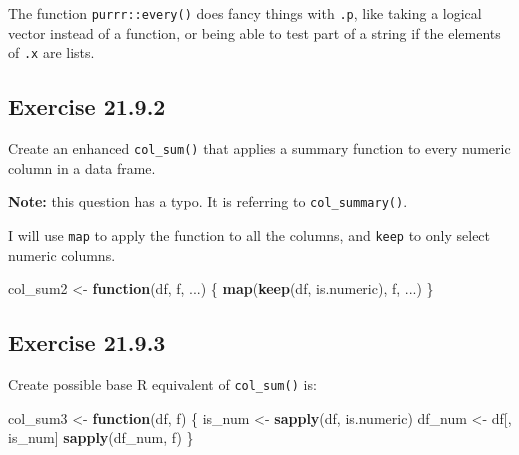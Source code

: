 \documentclass[]{book}
\newenvironment{Shaded}{\begin{snugshade}}{\end{snugshade}}
\newcommand{\CommentTok}[1]{\textcolor[rgb]{0.56,0.35,0.01}{\textit{#1}}}
\newcommand{\ControlFlowTok}[1]{\textcolor[rgb]{0.13,0.29,0.53}{\textbf{#1}}}
\newcommand{\KeywordTok}[1]{\textcolor[rgb]{0.13,0.29,0.53}{\textbf{#1}}}
\newcommand{\NormalTok}[1]{#1}
\newcommand{\StringTok}[1]{\textcolor[rgb]{0.31,0.60,0.02}{#1}}
\theoremstyle{plain}
\theoremstyle{remark}
\theoremstyle{definition}
\theoremstyle{definition}
\theoremstyle{definition}
\theoremstyle{remark}
\begin{document}
The function \texttt{purrr::every()} does fancy things with \texttt{.p},
like taking a logical vector instead of a function, or being able to
test part of a string if the elements of \texttt{.x} are lists.

\hypertarget{exercise-21.9.2}{%
\subsection*{\texorpdfstring{Exercise
{21.9.2}}{Exercise 21.9.2}}\label{exercise-21.9.2}}

Create an enhanced \texttt{col\_sum()} that applies a summary function
to every numeric column in a data frame.

\textbf{Note:} this question has a typo. It is referring to
\texttt{col\_summary()}.

I will use \texttt{map} to apply the function to all the columns, and
\texttt{keep} to only select numeric columns.

\begin{Shaded}
\begin{Highlighting}[]
\NormalTok{col_sum2 <-}\StringTok{ }\ControlFlowTok{function}\NormalTok{(df, f, ...) \{}
  \KeywordTok{map}\NormalTok{(}\KeywordTok{keep}\NormalTok{(df, is.numeric), f, ...)}
\NormalTok{\}}
\end{Highlighting}
\end{Shaded}

\begin{Shaded}
\end{Shaded}

\hypertarget{exercise-21.9.3}{%
\subsection*{\texorpdfstring{Exercise
{21.9.3}}{Exercise 21.9.3}}\label{exercise-21.9.3}}

Create possible base R equivalent of \texttt{col\_sum()} is:

\begin{Shaded}
\begin{Highlighting}[]
\NormalTok{col_sum3 <-}\StringTok{ }\ControlFlowTok{function}\NormalTok{(df, f) \{}
\NormalTok{  is_num <-}\StringTok{ }\KeywordTok{sapply}\NormalTok{(df, is.numeric)}
\NormalTok{  df_num <-}\StringTok{ }\NormalTok{df[, is_num]}
  \KeywordTok{sapply}\NormalTok{(df_num, f)}
\NormalTok{\}}
\end{Highlighting}
\end{Shaded}
\end{document}
